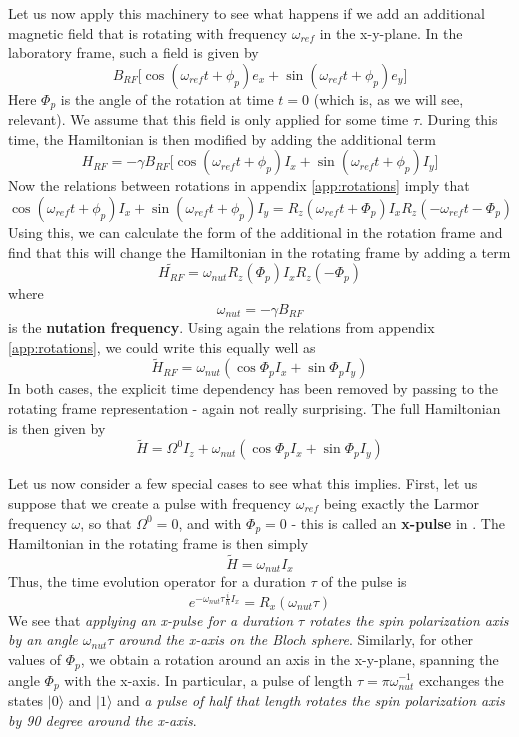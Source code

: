 \documentclass[a4paper, draft]{article}
\theoremstyle{own}
\theoremstyle{remark}
\begin{document}
Let us now apply this machinery to see what happens if we add an additional magnetic field that is rotating with frequency $\omega_{ref}$ in the x-y-plane. In the laboratory frame, such a field is given by
$$
B_{RF} \big[ \cos (\omega_{ref} t + \phi_p) e_x + \sin(\omega_{ref} t + \phi_p) e_y \big] 
$$
Here $\Phi_p$ is the angle of the rotation at time $t = 0$ (which is, as we will see, relevant). We assume that this field is only applied for some time $\tau$. During this time, the Hamiltonian is then modified by adding the additional term
$$
H_{RF} = - \gamma B_{RF} \big[ \cos (\omega_{ref} t + \phi_p) I_x + \sin(\omega_{ref} t + \phi_p) I_y \big] 
$$
Now the relations between rotations in appendix \ref{app:rotations} imply that
$$
\cos (\omega_{ref} t + \phi_p) I_x + \sin(\omega_{ref} t + \phi_p) I_y 
=
R_z(\omega_{ref} t + \Phi_p) I_x R_z(-\omega_{ref} t - \Phi_p)
$$
Using this, we can calculate the form of the additional in the rotation frame and find that this will change the Hamiltonian in the rotating frame by adding a term
$$
\widetilde{H_{RF}} =  \omega_{nut} R_z(\Phi_p) I_x R_z(-\Phi_p)
$$
where 
$$
\omega_{nut} = -\gamma B_{RF}
$$
is the {\bf nutation frequency}. Using again the relations from appendix \ref{app:rotations}, we could write this equally well as
$$
\widetilde{H}_{RF} =  \omega_{nut} ( \cos \Phi_p I_x + \sin \Phi_p I_y)
$$
In both cases, the explicit time dependency has been removed by passing to the rotating frame representation - again not really surprising. The full Hamiltonian is then given by
$$
\widetilde{H} = \Omega^0 I_z + \omega_{nut} ( \cos \Phi_p I_x + \sin \Phi_p I_y)
$$


Let us now consider a few special cases to see what this implies. First, let us suppose that we create a pulse with frequency $\omega_{ref}$ being exactly the Larmor frequency $\omega$, so that $\Omega^0 = 0$, and with $\Phi_p = 0$ - this is called an {\bf x-pulse} in \cite{Levitt}. The Hamiltonian in the rotating frame is then simply
$$
\widetilde{H} = \omega_{nut} I_x
$$
Thus, the time evolution operator for a duration $\tau$ of the pulse is
$$
e^{ -\omega_{nut} \tau \frac{i}{\hbar} I_x} = R_x(\omega_{nut} \tau)
$$
We see that \emph{applying an x-pulse for a duration $\tau$ rotates the spin polarization axis by an angle $\omega_{nut} \tau$ around the x-axis on the Bloch sphere}. Similarly, for other values of $\Phi_p$, we obtain a rotation around an axis in the x-y-plane, spanning the angle $\Phi_p$ with the x-axis. In particular, a pulse of length $\tau = \pi \omega_{nut}^{-1}$ exchanges the states $|0 \rangle$ and $|1 \rangle$ and  {\it a pulse of half that length  rotates the spin polarization axis by 90 degree around the x-axis}.
\end{document}
